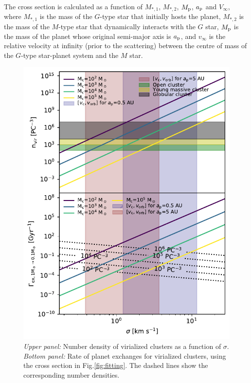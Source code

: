 \documentclass[twocolumn]{aastex62}
\begin{document}
The cross section is calculated as a function of $M_{*,1}$, $M_{*,2}$, $M_{\rm p}$, $a_{\rm p}$ and $V_\infty$, where $M_{*,1}$ is the mass of the $G$-type star that initially hosts the planet, $M_{*,2}$ is the mass of the $M$-type star that dynamically interacts with the $G$ star, $M_{\rm p}$ is the mass of the planet whose original semi-major axis is $a_{\rm p}$, and $v_\infty$ is the relative velocity at infinity (prior to the scattering) between the centre of mass of the $G$-type star-planet system and the $M$ star.

\begin{figure}
 \includegraphics[width=1\columnwidth]{letter-rate-dispersion}
  \caption{\textit{Upper panel:} Number density of virialized clusters as a function of $\sigma$. \textit{Bottom panel:} Rate of planet exchanges for virialized clusters,  using the cross section in Fig.\ref{fig:fitting}. The dashed lines show the corresponding number densities.}
 \label{fig:rate}
\end{figure}
\end{document}
